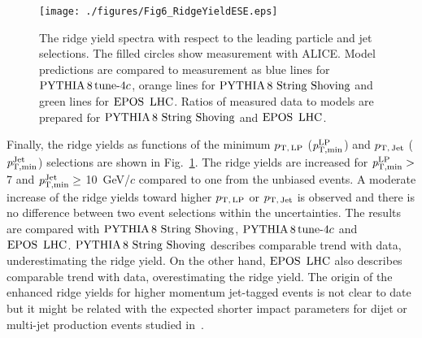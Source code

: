 \begin{figure}[h!]
	\centering
	\texttt{[image: ./figures/Fig6\_RidgeYieldESE.eps]}
	\caption{The ridge yield spectra with respect to the leading particle and jet selections. The filled circles show measurement with ALICE. Model predictions are compared to measurement as blue lines for $\mathrm{PYTHIA}\,8\,\mathrm{tune}{\text -}4c$, orange lines for ${\mathrm{PYTHIA}\,8~\mathrm{String}~}\mathrm{Shoving}$ and green lines for ${\mathrm{EPOS}\,~\mathrm{LHC}}$. Ratios of measured data to models are prepared for ${\mathrm{PYTHIA}\,8~\mathrm{String}~}\mathrm{Shoving}$ and ${\mathrm{EPOS}\,~\mathrm{LHC}}$.}
	\label{fig:RidgeYield_ESE}
\end{figure}

Finally, the ridge yields as functions of the minimum $p_\mathrm{T,\,LP}$ ($\it{p}^{\rm{LP}}_{\rm{T,min}}$) and $p_\mathrm{T,\,Jet}$ ($\it{p}^{\rm{Jet}}_{\rm{T,min}}$) selections are shown in Fig.~\ref{fig:RidgeYield_ESE}. The ridge yields are increased for $\it{p}^{\rm{LP}}_{\rm{T,min}} >$ 7 and $\it{p}^{\rm{Jet}}_{\rm{T,min}} \ge$ 10~GeV/$c$ compared to one from the unbiased events. A moderate increase of the ridge yields toward higher $p_\mathrm{T,\,LP}$ or $p_\mathrm{T,\,Jet}$ is observed and there is no difference between two event selections within the uncertainties.
The results are compared with ${\mathrm{PYTHIA}\,8~\mathrm{String}~}\mathrm{Shoving}$, $\mathrm{PYTHIA}\,8\,\mathrm{tune}{\text -}4c$ and ${\mathrm{EPOS}\,~\mathrm{LHC}}$. ${\mathrm{PYTHIA}\,8~\mathrm{String}~}\mathrm{Shoving}$ describes comparable trend with data, underestimating the ridge yield. On the other hand, ${\mathrm{EPOS}\,~\mathrm{LHC}}$ also describes comparable trend with data, overestimating the ridge yield. The origin of the enhanced ridge yields for higher momentum jet-tagged events is not clear to date but it might be related with the expected shorter impact parameters for dijet or multi-jet production events studied in~\cite{Frankfurt:2010ea}.